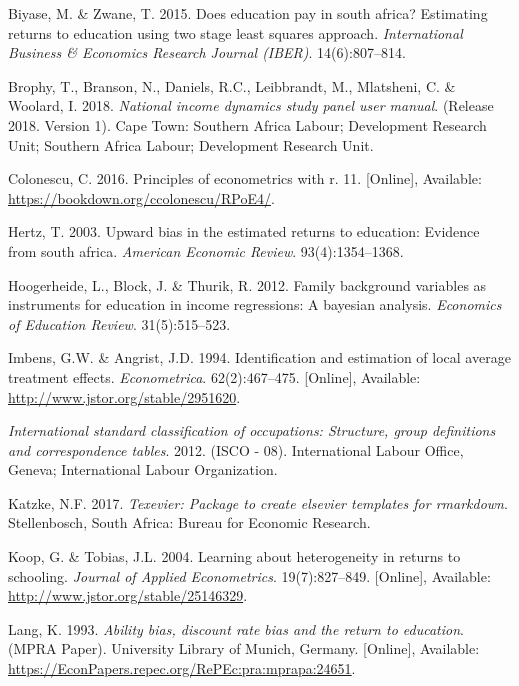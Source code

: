 \documentclass[11pt,preprint, authoryear]{elsarticle}
\numberwithin{equation}{section}
\numberwithin{figure}{section}
\numberwithin{table}{section}
\newlength{\cslhangindent}
\newenvironment{CSLReferences}%
  {\setlength{\parindent}{0pt}%
  \everypar{\setlength{\hangindent}{\cslhangindent}}\ignorespaces}%
  {\par}
\begin{document}
\hypertarget{refs}{}
\begin{CSLReferences}{1}{0}
\leavevmode\hypertarget{ref-agree}{}%
Biyase, M. \& Zwane, T. 2015. Does education pay in south africa?
Estimating returns to education using two stage least squares approach.
\emph{International Business \& Economics Research Journal (IBER)}.
14(6):807--814.

\leavevmode\hypertarget{ref-nids5}{}%
Brophy, T., Branson, N., Daniels, R.C., Leibbrandt, M., Mlatsheni, C. \&
Woolard, I. 2018. \emph{National income dynamics study panel user
manual}. (Release 2018. Version 1). Cape Town: Southern Africa Labour;
Development Research Unit; Southern Africa Labour; Development Research
Unit.

\leavevmode\hypertarget{ref-R}{}%
Colonescu, C. 2016. Principles of econometrics with r. 11. {[}Online{]},
Available: \url{https://bookdown.org/ccolonescu/RPoE4/}.

\leavevmode\hypertarget{ref-hertz}{}%
Hertz, T. 2003. Upward bias in the estimated returns to education:
Evidence from south africa. \emph{American Economic Review}.
93(4):1354--1368.

\leavevmode\hypertarget{ref-block}{}%
Hoogerheide, L., Block, J. \& Thurik, R. 2012. Family background
variables as instruments for education in income regressions: A bayesian
analysis. \emph{Economics of Education Review}. 31(5):515--523.

\leavevmode\hypertarget{ref-ang}{}%
Imbens, G.W. \& Angrist, J.D. 1994. Identification and estimation of
local average treatment effects. \emph{Econometrica}. 62(2):467--475.
{[}Online{]}, Available: \url{http://www.jstor.org/stable/2951620}.

\leavevmode\hypertarget{ref-isco}{}%
\emph{International standard classification of occupations: Structure,
group definitions and correspondence tables}. 2012. (ISCO - 08).
International Labour Office, Geneva; International Labour Organization.

\leavevmode\hypertarget{ref-Texevier}{}%
Katzke, N.F. 2017. \emph{{Texevier}: {P}ackage to create elsevier
templates for rmarkdown}. Stellenbosch, South Africa: Bureau for
Economic Research.

\leavevmode\hypertarget{ref-return}{}%
Koop, G. \& Tobias, J.L. 2004. Learning about heterogeneity in returns
to schooling. \emph{Journal of Applied Econometrics}. 19(7):827--849.
{[}Online{]}, Available: \url{http://www.jstor.org/stable/25146329}.

\leavevmode\hypertarget{ref-disc}{}%
Lang, K. 1993. \emph{Ability bias, discount rate bias and the return to
education}. (MPRA Paper). University Library of Munich, Germany.
{[}Online{]}, Available:
\url{https://EconPapers.repec.org/RePEc:pra:mprapa:24651}.


\end{CSLReferences}
\end{document}

